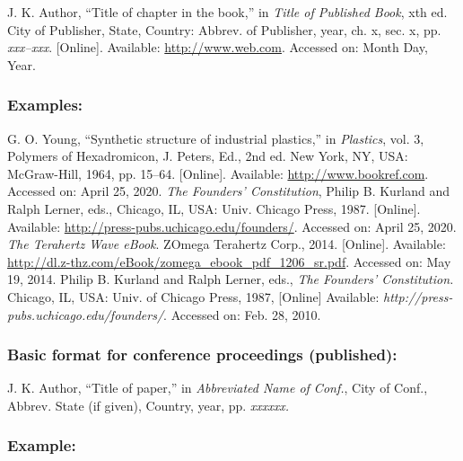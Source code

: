 \documentclass{IEEEoj}
\begin{document}
\begin{thebibliography}{00}
 J. K. Author, ``Title of chapter in the book,'' in \textit{Title of Published Book}, xth ed. City of
Publisher, State, Country: Abbrev. of Publisher, year, ch. x, sec. x, pp.
\textit{xxx--xxx}. [Online]. Available: \underline {http://www.web.com}. Accessed on: Month
Day, Year.
\end{thebibliography}

\subsubsection*{Examples:}

\begin{thebibliography}{00}
 G. O. Young, ``Synthetic structure of industrial
plastics,'' in \emph{Plastics}, vol. 3, Polymers of Hexadromicon, J.
Peters, Ed., 2nd ed. New York, NY, USA: McGraw-Hill, 1964, pp. 15--64.
[Online]. Available: \underline{http://www.bookref.com}. Accessed on: April 25, 2020.
 \textit{The Founders' Constitution}, Philip B. Kurland and Ralph Lerner, eds., Chicago, IL, USA: Univ. Chicago Press, 1987. [Online]. Available: \underline {http://press-pubs.uchicago.edu/founders/}. Accessed on: April 25, 2020.
 \emph{The Terahertz Wave eBook}. ZOmega Terahertz
Corp., 2014. [Online]. Available: \underline{http://dl.z-thz.com/eBook/zomega\_ebook\_pdf\_1206\_sr.pdf}. Accessed on: May 19, 2014.
 Philip B. Kurland and Ralph Lerner, eds., \textit{The
Founders' Constitution. }Chicago, IL, USA: Univ. of Chicago Press, 1987, [Online] Available: \emph{http://press-pubs.uchicago.edu/founders/}. Accessed on: Feb. 28, 2010.
\end{thebibliography}

\subsubsection*{Basic format for conference proceedings (published):}

\begin{thebibliography}{00}
 J. K. Author, ``Title of paper,'' in \textit{Abbreviated Name of Conf.}, City of Conf., Abbrev. State (if
given), Country, year, pp. \textit{xxxxxx.}
\end{thebibliography}

\subsubsection*{Example:}
\end{document}
